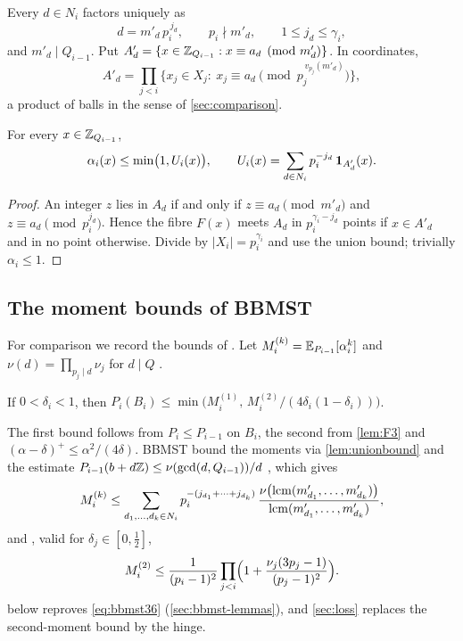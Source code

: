 Every $d\in N_i$ factors uniquely as
\begin{equation}\label{eq:mprime}
  d=m'_d\,p_i^{\,j_d},\qquad p_i\nmid m'_d,\qquad 1\le j_d\le\gamma_i ,
\end{equation}
and $m'_d\mid Q_{i-1}$. Put $A'_d=\{x\in\mathbb{Z}_{Q_{i-1}}:x\equiv a_d\pmod{m'_d}\}$. In coordinates,
\begin{equation}\label{eq:Aprime-cylinder}
  A'_d=\prod_{j<i}\bigl\{x_j\in X_j:\ x_j\equiv a_d \pmod{p_j^{\,v_{p_j}(m'_d)}}\bigr\},
\end{equation}
a product of balls in the sense of \cref{sec:comparison}.

\begin{lemma}\label{lem:unionbound}
For every $x\in\mathbb{Z}_{Q_{i-1}}$,
\[
  \alpha_i(x)\le\min\bigl(1,U_i(x)\bigr),\qquad U_i(x)=\sum_{d\in N_i}p_i^{-j_d}\,\mathbf{1}_{A'_d}(x).
\]
\end{lemma}

\begin{proof}
An integer $z$ lies in $A_d$ if and only if $z\equiv a_d\pmod{m'_d}$ and $z\equiv a_d\pmod{p_i^{j_d}}$. Hence the
fibre $F(x)$ meets $A_d$ in $p_i^{\gamma_i-j_d}$ points if $x\in A'_d$ and in no point otherwise. Divide by
$|X_i|=p_i^{\gamma_i}$ and use the union bound; trivially $\alpha_i\le1$.
\end{proof}

\subsection{The moment bounds of BBMST}\label{sec:bbmst-moments}

For comparison we record the bounds of \cite{BBMST}. Let $M_i^{(k)}=\mathbb{E}_{P_{i-1}}[\alpha_i^k]$ and
$\nu(d)=\prod_{p_j\mid d}\nu_j$ for $d\mid Q$ \cite[(8)]{BBMST}.

\begin{lemma}\label{lem:bbmst33}
If $0<\delta_i<1$, then $P_i(B_i)\le\min\bigl(M_i^{(1)},\,M_i^{(2)}/(4\delta_i(1-\delta_i))\bigr)$.
\end{lemma}

The first bound follows from $P_i\le P_{i-1}$ on $B_i$, the second from \cref{lem:F3} and
$(\alpha-\delta)^+\le\alpha^2/(4\delta)$. BBMST bound the moments via \cref{lem:unionbound} and the estimate
$P_{i-1}(b+d\mathbb{Z})\le\nu(\gcd(d,Q_{i-1}))/d$ \cite[Lemma~3.4]{BBMST}, which gives \cite[Lemma~3.6]{BBMST}
\begin{equation}\label{eq:bbmst36}
  M_i^{(k)}\le\sum_{d_1,\dots,d_k\in N_i}p_i^{-(j_{d_1}+\dots+j_{d_k})}\,
  \frac{\nu\bigl(\operatorname{lcm}(m'_{d_1},\dots,m'_{d_k})\bigr)}{\operatorname{lcm}(m'_{d_1},\dots,m'_{d_k})},
\end{equation}
and \cite[Theorem~3.2]{BBMST}, valid for $\delta_j\in[0,\frac12]$,
\begin{equation}\label{eq:bbmst32}
  M_i^{(2)}\le\frac1{(p_i-1)^2}\prod_{j<i}\Bigl(1+\frac{\nu_j(3p_j-1)}{(p_j-1)^2}\Bigr).
\end{equation}
 below reproves \eqref{eq:bbmst36} (\cref{sec:bbmst-lemmas}), and \cref{sec:loss} replaces
the second-moment bound by the hinge.
